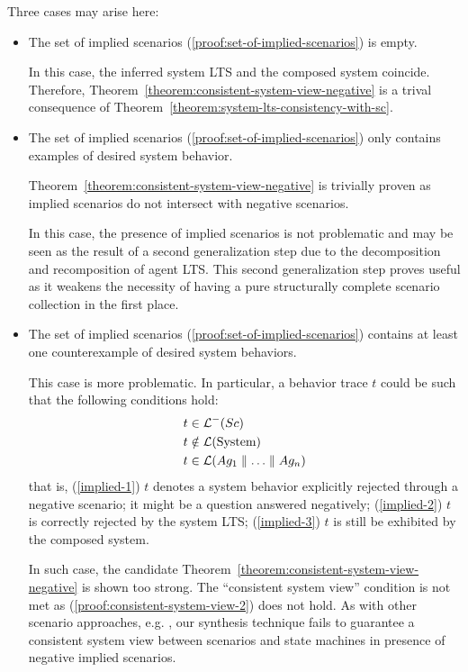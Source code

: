 Three cases may arise here:
\begin{itemize}
\item The set of implied scenarios (\ref{proof:set-of-implied-scenarios}) is empty. 

In this case, the inferred system LTS and the composed system coincide. Therefore, Theorem~\ref{theorem:consistent-system-view-negative} is a trival consequence of Theorem~\ref{theorem:system-lts-consistency-with-sc}.

\item The set of implied scenarios (\ref{proof:set-of-implied-scenarios}) only contains examples of desired system behavior.

Theorem~\ref{theorem:consistent-system-view-negative} is trivially proven as implied scenarios do not intersect with negative scenarios. 

In this case, the presence of implied scenarios is not problematic and may be seen as the result of a second generalization step due to the decomposition and recomposition of agent LTS. This second generalization step proves useful as it weakens the necessity of having a pure structurally complete scenario collection in the first place.

\item The set of implied scenarios (\ref{proof:set-of-implied-scenarios}) contains at least one counterexample of desired system behaviors. 

This case is more problematic. In particular, a behavior trace $t$ could be such that the following conditions hold:
\begin{align}
&t \in \mathcal{L}^-(Sc)\label{implied-1}\\
&t \notin \mathcal{L}(\mbox{System})\label{implied-2}\\
&t \in \mathcal{L}(Ag_1 \parallel \ldots \parallel Ag_n)\label{implied-3}
\end{align}
that is, (\ref{implied-1}) $t$ denotes a system behavior explicitly rejected through a negative scenario; it might be a question answered negatively; (\ref{implied-2}) $t$ is correctly rejected by the system LTS; (\ref{implied-3}) $t$ is still be exhibited by the composed system.

In such case, the candidate Theorem~\ref{theorem:consistent-system-view-negative} is shown too strong.  The ``consistent system view'' condition is not met as (\ref{proof:consistent-system-view-2}) does not hold. As with other scenario approaches, e.g. \cite{Alur:2000, Uchitel:2004}, our synthesis technique fails to guarantee a consistent system view between scenarios and state machines in presence of negative implied scenarios.


\end{itemize}
